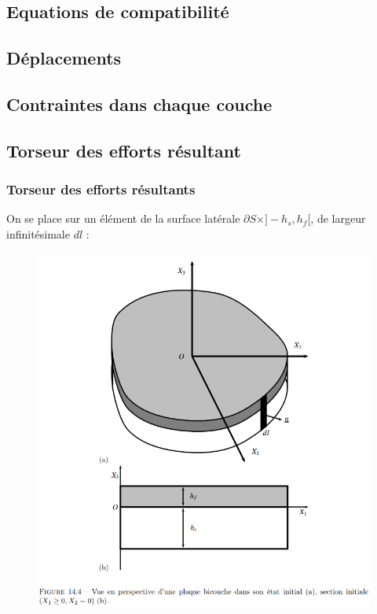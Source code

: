 \documentclass{beamer}
\begin{document}
\subsection{Equations de compatibilité} 
\subsection{Déplacements} 
\subsection{Contraintes dans chaque couche} 
\subsection{Torseur des efforts résultant}

\begin{frame}
    \frametitle{Torseur des efforts résultants}
    On se place sur un élément de la surface latérale $\partial S \times ]-h_s,h_f[$, de largeur infinitésimale $dl$ :
    \begin{figure}
        \centering
        \includegraphics[scale=0.5]{imgs/surface_etude.png}
    \end{figure}
\end{frame}
\end{document}
